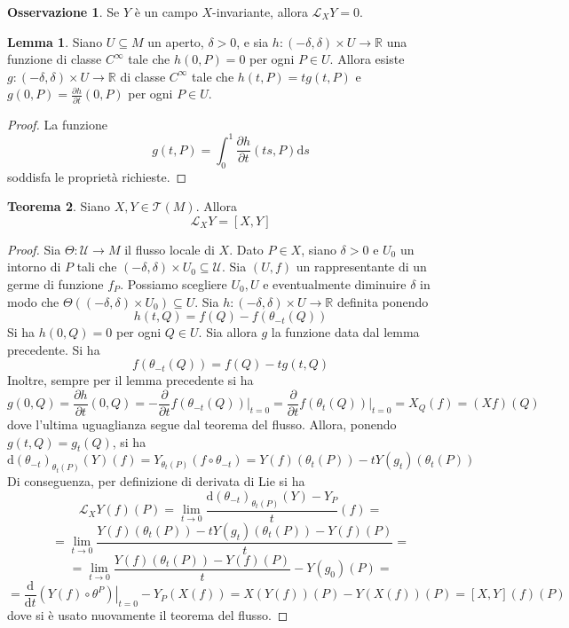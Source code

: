 \documentclass[a4paper,11pt]{article}
\theoremstyle{definition}
\newtheorem{osservazione}{Osservazione}[section]
\theoremstyle{theorem}
\newtheorem{teorema}{Teorema}[section]
\newtheorem{lemma}[teorema]{Lemma}
\newcommand{\lie}[2]{\mathcal{L}_{#1}#2}
\newcommand{\dif}{\mathrm{d}}
\newcommand{\R}{\mathbb{R}}
\begin{document}
\begin{osservazione}
	Se $Y$ è un campo $X$-invariante, allora $\lie{X}{Y}=0$.
\end{osservazione}
\begin{lemma}
	Siano $U\subseteq M$ un aperto, $\delta>0$, e sia $h\colon(-\delta,\delta)\times U\to\R$ una funzione di classe $C^\infty$ tale che $h(0,P)=0$ per ogni $P\in U$. Allora esiste $g\colon(-\delta,\delta)\times U\to\R$ di classe $C^\infty$ tale che $h(t,P)=tg(t,P)$ e $g(0,P)=\frac{\partial h}{\partial t}(0,P)$ per ogni $P\in U$.
\end{lemma}
\begin{proof}
	La funzione
	\[g(t,P)=\int_{0}^{1}\frac{\partial h}{\partial t}(ts,P)\dif s\]
	soddisfa le proprietà richieste.
\end{proof}
\begin{teorema}
	\label{lie}
	Siano $X,Y\in\mathcal{T}(M)$. Allora
	\[\lie{X}{Y}=[X,Y]\]
\end{teorema}
\begin{proof}
	Sia $\Theta\colon\mathcal{U}\to M$ il flusso locale di $X$. Dato $P\in X$, siano $\delta>0$ e $U_0$ un intorno di $P$ tali che $(-\delta,\delta)\times U_0\subseteq\mathcal{U}$. Sia $(U,f)$ un rappresentante di un germe di funzione $f_P$. Possiamo scegliere $U_0,U$ e eventualmente diminuire $\delta$ in modo che $\Theta((-\delta,\delta)\times U_0)\subseteq U$. Sia $h\colon(-\delta,\delta)\times U\to\R$ definita ponendo
	\[h(t,Q)=f(Q)-f(\theta_{-t}(Q))\]
	Si ha $h(0,Q)=0$ per ogni $Q\in U$. Sia allora $g$ la funzione data dal lemma precedente. Si ha
	\[f(\theta_{-t}(Q))=f(Q)-tg(t,Q)\]
	Inoltre, sempre per il lemma precedente si ha
	\[g(0,Q)=\frac{\partial h}{\partial t}(0,Q)=-\frac{\partial}{\partial t}\left.f(\theta_{-t}(Q))\right|_{t=0}=\frac{\partial}{\partial t}\left.f(\theta_t(Q))\right|_{t=0}=X_Q(f)=(Xf)(Q)\]
	dove l'ultima uguaglianza segue dal teorema del flusso. Allora, ponendo $g(t,Q)=g_t(Q)$, si ha
	\[\dif(\theta_{-t})_{\theta_t(P)}(Y)(f)=Y_{\theta_t(P)}(f\circ\theta_{-t})=Y(f)(\theta_t(P))-tY(g_t)(\theta_t(P))\]
	Di conseguenza, per definizione di derivata di Lie si ha
	\[\lie{X}{Y}(f)(P)=\lim\limits_{t\to0}\frac{\dif(\theta_{-t})_{\theta_t(P)}(Y)-Y_P}{t}(f)=\]
	\[=\lim\limits_{t\to0}\frac{Y(f)(\theta_t(P))-tY(g_t)(\theta_t(P))-Y(f)(P)}{t}=\]\[=\lim\limits_{t\to0}\frac{Y(f)(\theta_t(P))-Y(f)(P)}{t}-Y(g_0)(P)=\]
	\[=\frac{\dif}{\dif t}\left.(Y(f)\circ\theta^P)\right|_{t=0}-Y_P(X(f))=X(Y(f))(P)-Y(X(f))(P)=[X,Y](f)(P)\]
	dove si è usato nuovamente il teorema del flusso.
\end{proof}
\end{document}

